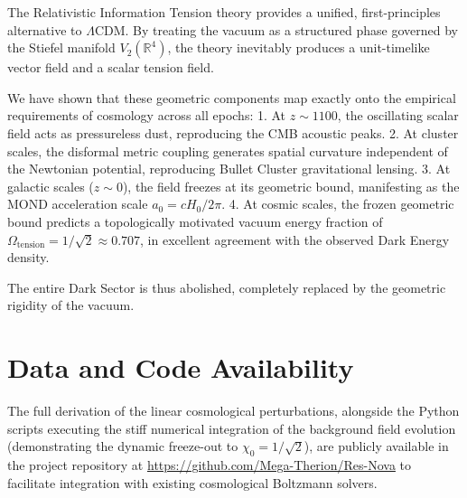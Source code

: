 \documentclass[twocolumn,amsmath,amssymb,floatfix]{article}
\newcommand{\lcdm}{\ensuremath{\Lambda}CDM}
\begin{document}
The Relativistic Information Tension theory provides a unified, first-principles alternative to \lcdm. By treating the vacuum as a structured phase governed by the Stiefel manifold $V_2(\mathbb{R}^4)$, the theory inevitably produces a unit-timelike vector field and a scalar tension field.

We have shown that these geometric components map exactly onto the empirical requirements of cosmology across all epochs:
1. At $z \sim 1100$, the oscillating scalar field acts as pressureless dust, reproducing the CMB acoustic peaks.
2. At cluster scales, the disformal metric coupling generates spatial curvature independent of the Newtonian potential, reproducing Bullet Cluster gravitational lensing.
3. At galactic scales ($z \sim 0$), the field freezes at its geometric bound, manifesting as the MOND acceleration scale $a_0 = c H_0 / 2\pi$.
4. At cosmic scales, the frozen geometric bound predicts a topologically motivated vacuum energy fraction of $\Omega_{\text{tension}} = 1/\sqrt{2} \approx 0.707$, in excellent agreement with the observed Dark Energy density.

The entire Dark Sector is thus abolished, completely replaced by the geometric rigidity of the vacuum.

\section*{Data and Code Availability}
The full derivation of the linear cosmological perturbations, alongside the Python scripts executing the stiff numerical integration of the background field evolution (demonstrating the dynamic freeze-out to $\chi_0 = 1/\sqrt{2}$), are publicly available in the project repository at \url{https://github.com/Mega-Therion/Res-Nova} to facilitate integration with existing cosmological Boltzmann solvers.
\end{document}
